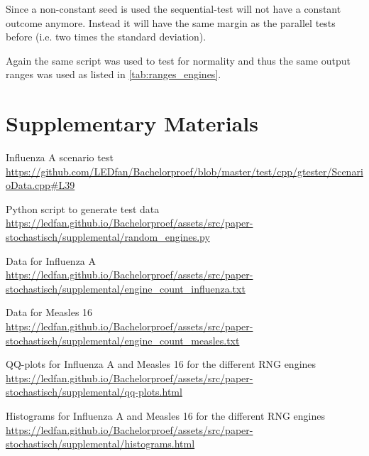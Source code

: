 \documentclass[natbib=true]{acmart}
\begin{document}
Since a non-constant seed is used the sequential-test will not have a constant outcome anymore. Instead it will have the same margin as the parallel tests before (i.e. two times the standard deviation).

Again the same script was used to test for normality and thus the same output ranges was used as listed in \cref{tab:ranges_engines}.

\section{Supplementary Materials}

    \begin{enumerate}[label={[\arabic*]},ref={[sup~\arabic*]}]
        \item Influenza A scenario test \\
            \url{https://github.com/LEDfan/Bachelorproef/blob/master/test/cpp/gtester/ScenarioData.cpp\#L39}
            \label{sup:influenza_a}
    
        \item Python script to generate test data \\
            \url{https://ledfan.github.io/Bachelorproef/assets/src/paper-stochastisch/supplemental/random_engines.py} 
            \label{sup:random_engines.py}
            
        \item Data for Influenza A \\
            \url{https://ledfan.github.io/Bachelorproef/assets/src/paper-stochastisch/supplemental/engine_count_influenza.txt}
            \label{sup:data-points:a}
            
        \item Data for Measles 16 \\
            \url{https://ledfan.github.io/Bachelorproef/assets/src/paper-stochastisch/supplemental/engine_count_measles.txt}
            \label{sup:data-points:16}
            
        \item QQ-plots for Influenza A and Measles 16 for the different RNG engines \\ 
            \url{https://ledfan.github.io/Bachelorproef/assets/src/paper-stochastisch/supplemental/qq-plots.html} 
            \label{sup:qq-plots}
        
        \item Histograms for Influenza A and Measles 16 for the different RNG engines \\ 
            \url{https://ledfan.github.io/Bachelorproef/assets/src/paper-stochastisch/supplemental/histograms.html} 
            \label{sup:histograms}
            
    \end{enumerate}
    



\end{document}
